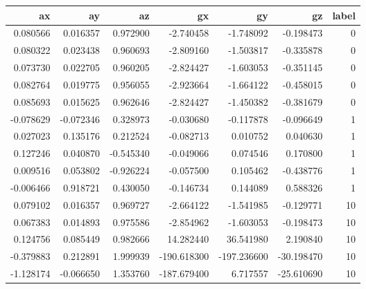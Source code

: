 \begin{tabular}{rrrrrrr}
\toprule
ax & ay & az & gx & gy & gz & label \\
\midrule
0.080566 & 0.016357 & 0.972900 & -2.740458 & -1.748092 & -0.198473 & 0 \\
0.080322 & 0.023438 & 0.960693 & -2.809160 & -1.503817 & -0.335878 & 0 \\
0.073730 & 0.022705 & 0.960205 & -2.824427 & -1.603053 & -0.351145 & 0 \\
0.082764 & 0.019775 & 0.956055 & -2.923664 & -1.664122 & -0.458015 & 0 \\
0.085693 & 0.015625 & 0.962646 & -2.824427 & -1.450382 & -0.381679 & 0 \\
-0.078629 & -0.072346 & 0.328973 & -0.030680 & -0.117878 & -0.096649 & 1 \\
0.027023 & 0.135176 & 0.212524 & -0.082713 & 0.010752 & 0.040630 & 1 \\
0.127246 & 0.040870 & -0.545340 & -0.049066 & 0.074546 & 0.170800 & 1 \\
0.009516 & 0.053802 & -0.926224 & -0.057500 & 0.105462 & -0.438776 & 1 \\
-0.006466 & 0.918721 & 0.430050 & -0.146734 & 0.144089 & 0.588326 & 1 \\
0.079102 & 0.016357 & 0.969727 & -2.664122 & -1.541985 & -0.129771 & 10 \\
0.067383 & 0.014893 & 0.975586 & -2.854962 & -1.603053 & -0.198473 & 10 \\
0.124756 & 0.085449 & 0.982666 & 14.282440 & 36.541980 & 2.190840 & 10 \\
-0.379883 & 0.212891 & 1.999939 & -190.618300 & -197.236600 & -30.198470 & 10 \\
-1.128174 & -0.066650 & 1.353760 & -187.679400 & 6.717557 & -25.610690 & 10 \\
\bottomrule
\end{tabular}

